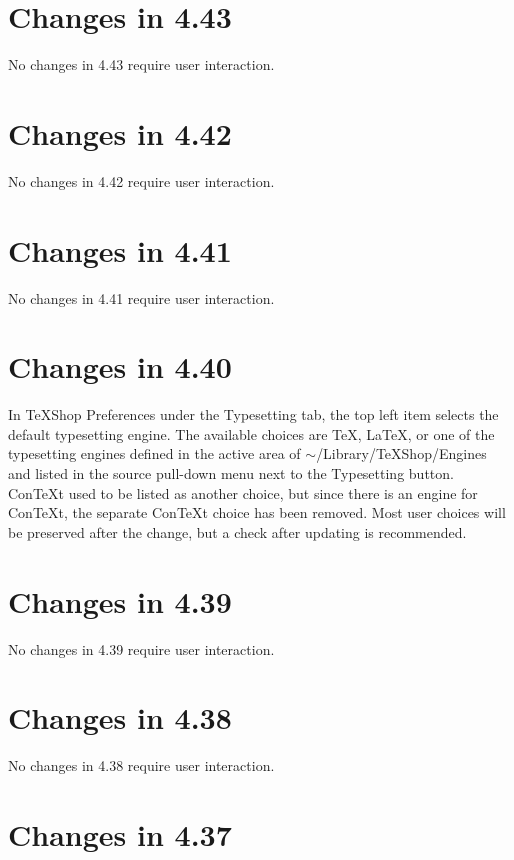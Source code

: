 \documentclass[11pt, oneside]{amsart}
\begin{document}
\section{Changes in 4.43}

No changes in 4.43 require user interaction.

\section{Changes in 4.42}

No changes in 4.42 require user interaction.

\section{Changes in 4.41}

No changes in 4.41 require user interaction.


\section{Changes in 4.40}

In TeXShop Preferences under the Typesetting tab, the top left item selects the default typesetting engine. The available choices are TeX, LaTeX, or one of the typesetting engines defined in the active area of $\sim$/Library/TeXShop/Engines and listed in the source pull-down menu next to the Typesetting button.  ConTeXt used to be listed as another choice, but since there is an engine for ConTeXt, the separate ConTeXt choice has been removed. Most user choices will be preserved after the change, but a check after updating is recommended.


\section{Changes in 4.39}

No changes in 4.39 require user interaction.

\section{Changes in 4.38}

No changes in 4.38 require user interaction.

\section{Changes in 4.37}
\end{document}
